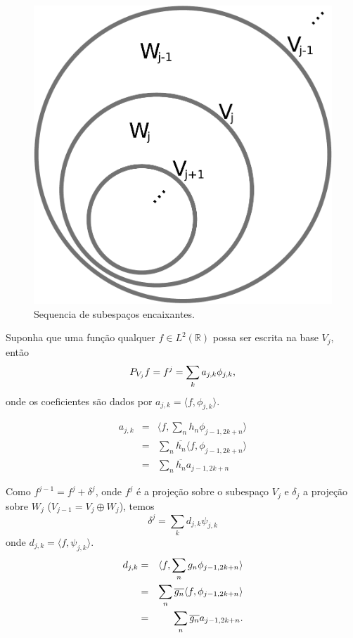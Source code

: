 \begin{frame}[allowframebreaks]
  \framebreak

  \begin{figure}[hptb]
  \centering
  \includegraphics[width=.3\textwidth]{images/subespacos_encaixantes.pdf}
  \caption{Sequencia de subespaços encaixantes.}
  \label{fig:subespacos_encaixantes}
  \end{figure} 

  \framebreak

  Suponha que uma função qualquer $f \in L^2(\mathbb{R})$ 
  possa ser escrita na base $V_{j}$, então
  \begin{equation}
  P_{V_j} f = f^j = \sum_{k} a_{j,k} \phi_{j,k} \textmd{,}
  \label{eq:f_em_Vj}
  \end{equation}
  onde os coeficientes são dados por $a_{j,k} = \langle f, \phi_{j,k} \rangle$.

  \begin{eqnarray}
  a_{j,k} &=& \langle f, \sum_{n} h_n \phi_{j-1,2k+n} \rangle \nonumber \\
          &=& \sum_{n} \overline{h_n} \langle f, \phi_{j-1,2k+n} \rangle \nonumber \\
          &=& \sum_{n} \overline{h_n} a_{j-1,2k+n}
  \label{eq:coef_ajk_reescrito}
  \end{eqnarray}

  \framebreak

  Como $f^{j-1} = f^{j} + \delta^{j}$, onde 
  $f^{j}$ é a projeção sobre o subespaço $V_{j}$ e $\delta_{j}$ a projeção sobre
  $W_{j}$ ($V_{j-1} = V_{j} \oplus W_{j}$), temos
  \begin{equation}
  \delta^j = \sum_k d_{j,k} \psi_{j,k}
  \label{eq:funcao_delta_detalhe}
  \end{equation}
  onde $d_{j,k} = \langle f, \psi_{j,k} \rangle$.
  \begin{eqnarray}
  d_{j,k} &=& \langle f, \sum_{n} g_n \phi_{j-1,2k+n} \rangle \nonumber \\
        &=& \sum_{n} \overline{g_n} \langle f, \phi_{j-1,2k+n} \rangle \nonumber \\
        &=& \sum_{n} \overline{g_n} a_{j-1,2k+n} \textmd{.}
  \label{eq:coef_djk_ajk}
  \end{eqnarray}

\end{frame} 


